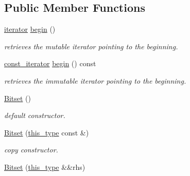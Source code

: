 \subsection*{Public Member Functions}
\begin{DoxyCompactItemize}
\item 
\hypertarget{classhryky_1_1_bitset_aabb589198362742daad95e914b590187}{\hyperlink{classhryky_1_1iterator_1_1random_1_1_mutable}{iterator} \hyperlink{classhryky_1_1_bitset_aabb589198362742daad95e914b590187}{begin} ()}\label{classhryky_1_1_bitset_aabb589198362742daad95e914b590187}

\begin{DoxyCompactList}\small\item\em retrieves the mutable iterator pointing to the beginning. \end{DoxyCompactList}\item 
\hypertarget{classhryky_1_1_bitset_ac4b8961a631215c83c16077e97239dc9}{\hyperlink{classhryky_1_1iterator_1_1random_1_1_immutable}{const\-\_\-iterator} \hyperlink{classhryky_1_1_bitset_ac4b8961a631215c83c16077e97239dc9}{begin} () const }\label{classhryky_1_1_bitset_ac4b8961a631215c83c16077e97239dc9}

\begin{DoxyCompactList}\small\item\em retrieves the immutable iterator pointing to the beginning. \end{DoxyCompactList}\item 
\hypertarget{classhryky_1_1_bitset_a28b1c686a006ded6ee81b0d3ea38d608}{\hyperlink{classhryky_1_1_bitset_a28b1c686a006ded6ee81b0d3ea38d608}{Bitset} ()}\label{classhryky_1_1_bitset_a28b1c686a006ded6ee81b0d3ea38d608}

\begin{DoxyCompactList}\small\item\em default constructor. \end{DoxyCompactList}\item 
\hypertarget{classhryky_1_1_bitset_ad183b186df75c98112608fe40d70a986}{\hyperlink{classhryky_1_1_bitset_ad183b186df75c98112608fe40d70a986}{Bitset} (\hyperlink{classhryky_1_1_bitset_a967bec88789e12e2ca96e7a73907822c}{this\-\_\-type} const \&)}\label{classhryky_1_1_bitset_ad183b186df75c98112608fe40d70a986}

\begin{DoxyCompactList}\small\item\em copy constructor. \end{DoxyCompactList}\item 
\hypertarget{classhryky_1_1_bitset_ab29dc9adcba6fdf264f66a229ca7feed}{\hyperlink{classhryky_1_1_bitset_ab29dc9adcba6fdf264f66a229ca7feed}{Bitset} (\hyperlink{classhryky_1_1_bitset_a967bec88789e12e2ca96e7a73907822c}{this\-\_\-type} \&\&rhs)}\label{classhryky_1_1_bitset_ab29dc9adcba6fdf264f66a229ca7feed}


\end{DoxyCompactItemize}
